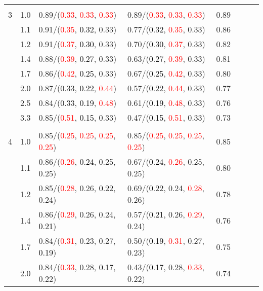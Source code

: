 \documentclass[10pt,a4paper]{report}
\begin{document}
\begin{table}[!htbp]
\begin{center}
{\begin{tabular}{ccllcccc}
			&&&&\\
			3			&1.0&0.89/(\textcolor{red}{0.33}, \textcolor{red}{0.33}, \textcolor{red}{0.33})&0.89/(\textcolor{red}{0.33}, \textcolor{red}{0.33}, \textcolor{red}{0.33})&0.89\\
			&1.1&0.91/(\textcolor{red}{0.35}, \textcolor{black}{0.32}, 0.33)&0.77/(\textcolor{black}{0.32}, \textcolor{red}{0.35}, 0.33)&0.86\\
			&1.2&0.91/(\textcolor{red}{0.37}, \textcolor{black}{0.30}, 0.33)&0.70/(\textcolor{black}{0.30}, \textcolor{red}{0.37}, 0.33)&0.82\\
			&1.4&0.88/(\textcolor{red}{0.39}, \textcolor{black}{0.27}, 0.33)&0.63/(\textcolor{black}{0.27}, \textcolor{red}{0.39}, 0.33)&0.81\\
			&1.7&0.86/(\textcolor{red}{0.42}, \textcolor{black}{0.25}, 0.33)&0.67/(\textcolor{black}{0.25}, \textcolor{red}{0.42}, 0.33)&0.80\\
			&2.0&0.87/(0.33, \textcolor{black}{0.22}, \textcolor{red}{0.44})&0.57/(\textcolor{black}{0.22}, \textcolor{red}{0.44}, 0.33)&0.77\\
			&2.5&0.84/(0.33, \textcolor{black}{0.19}, \textcolor{red}{0.48})&0.61/(\textcolor{black}{0.19}, \textcolor{red}{0.48}, 0.33)&0.76\\
			&3.3&0.85/(\textcolor{red}{0.51}, \textcolor{black}{0.15}, 0.33)&0.47/(\textcolor{black}{0.15}, \textcolor{red}{0.51}, 0.33)&0.73\\
			&&&&\\
			4			&1.0&0.85/(\textcolor{red}{0.25}, \textcolor{red}{0.25}, \textcolor{red}{0.25}, \textcolor{red}{0.25})&0.85/(\textcolor{red}{0.25}, \textcolor{red}{0.25}, \textcolor{red}{0.25}, \textcolor{red}{0.25})&0.85\\
			&1.1&0.86/(\textcolor{red}{0.26}, \textcolor{black}{0.24}, 0.25, 0.25)&0.67/(\textcolor{black}{0.24}, \textcolor{red}{0.26}, 0.25, 0.25)&0.80\\
			&1.2&0.85/(\textcolor{red}{0.28}, 0.26, \textcolor{black}{0.22}, 0.24)&0.69/(\textcolor{black}{0.22}, 0.24, \textcolor{red}{0.28}, 0.26)&0.78\\
			&1.4&0.86/(\textcolor{red}{0.29}, 0.26, 0.24, \textcolor{black}{0.21})&0.57/(\textcolor{black}{0.21}, 0.26, \textcolor{red}{0.29}, 0.24)&0.76\\
			&1.7&0.84/(\textcolor{red}{0.31}, 0.23, 0.27, \textcolor{black}{0.19})&0.50/(\textcolor{black}{0.19}, \textcolor{red}{0.31}, 0.27, 0.23)&0.75\\
			&2.0&0.84/(\textcolor{red}{0.33}, 0.28, \textcolor{black}{0.17}, 0.22)&0.43/(\textcolor{black}{0.17}, 0.28, \textcolor{red}{0.33}, 0.22)&0.74\\

\end{tabular}}
\end{center}
\end{table}
\end{document}
